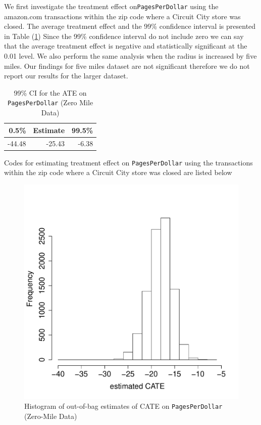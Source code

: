 \documentclass{article}
\begin{document}
We first investigate the treatment effect on\texttt{PagesPerDollar} using the amazon.com transactions within the zip code where a Circuit City store was closed. The average treatment effect  and the 99\% confidence interval is presented in Table (\ref{tab:ama_cf3_ate}) Since the 99\% confidence interval do not include zero we can say that the average treatment effect is negative and statistically significant at the 0.01 level. We also perform the same analysis when the radius is increased by five miles. Our findings for five miles dataset are not significant therefore we do not report our results for the larger dataset.\\

\begin{table}[h]
\caption{99\% CI for the ATE on \texttt{PagesPerDollar} (Zero Mile Data)} 
\label{tab:ama_cf3_ate}
\vspace{1em}
\centering
\begin{tabular}{rrr}
  \hline
 0.5\%  & Estimate & 99.5\% \\ 
  \hline
-44.48 & -25.43 & -6.38 \\ 
   \hline
\end{tabular}
\end{table}



Codes for estimating treatment effect on \texttt{PagesPerDollar} using the transactions within the zip code where a Circuit City store was closed are listed below



\begin{figure}[h]
\centering
\includegraphics[width=0.5\linewidth]{figures/tauhat3_ama_hist.pdf}\caption{Histogram of out-of-bag estimates of CATE  on \texttt{PagesPerDollar} (Zero-Mile Data)}\label{fig:tauhat3_ama_hist}
\end{figure}
\end{document}
